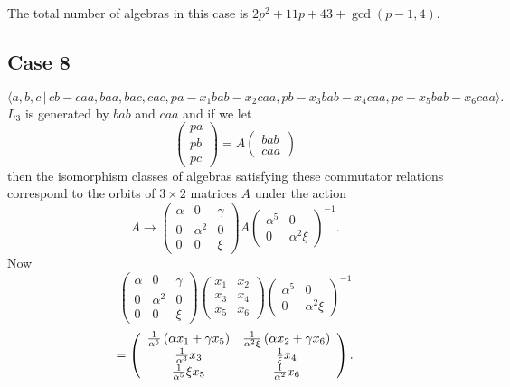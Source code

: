 \documentclass[10pt,thmsa]{article}
\begin{document}
The total number of algebras in this case is $2p^2+11p+43+\gcd (p-1,4)$.

\subsection{Case 8}

\[
\langle
a,b,c\,|%
\,cb-caa,baa,bac,cac,pa-x_{1}bab-x_{2}caa,pb-x_{3}bab-x_{4}caa,pc-x_{5}bab-x_{6}caa\rangle . 
\]%
$L_{3}$ is generated by $bab$ and $caa$ and if we let 
\[
\left( 
\begin{array}{l}
pa \\ 
pb \\ 
pc%
\end{array}%
\right) =A\left( 
\begin{array}{l}
bab \\ 
caa%
\end{array}%
\right) 
\]%
then the isomorphism classes of algebras satisfying these commutator
relations correspond to the orbits of $3\times 2$ matrices $A$ under the
action 
\[
A\rightarrow \left( 
\begin{array}{lll}
\alpha & 0 & \gamma \\ 
0 & \alpha ^{2} & 0 \\ 
0 & 0 & \xi%
\end{array}%
\right) A\left( 
\begin{array}{ll}
\alpha ^{5} & 0 \\ 
0 & \alpha ^{2}\xi%
\end{array}%
\right) ^{-1}. 
\]%
Now 
\[
\left( 
\begin{array}{lll}
\alpha & 0 & \gamma \\ 
0 & \alpha ^{2} & 0 \\ 
0 & 0 & \xi%
\end{array}%
\right) \left( 
\begin{array}{cc}
x_{1} & x_{2} \\ 
x_{3} & x_{4} \\ 
x_{5} & x_{6}%
\end{array}%
\right) \left( 
\begin{array}{ll}
\alpha ^{5} & 0 \\ 
0 & \alpha ^{2}\xi%
\end{array}%
\right) ^{-1} 
\]
\[
=\left( 
\begin{array}{cc}
\frac{1}{\alpha ^{5}}\left( \alpha x_{1}+\gamma x_{5}\right) & \frac{1}{%
\alpha ^{2}\xi }\left( \alpha x_{2}+\gamma x_{6}\right) \\ 
\frac{1}{\alpha ^{3}}x_{3} & \frac{1}{\xi }x_{4} \\ 
\frac{1}{\alpha ^{5}}\xi x_{5} & \frac{1}{\alpha ^{2}}x_{6}%
\end{array}%
\right) . 
\]%
$\allowbreak $
\end{document}
